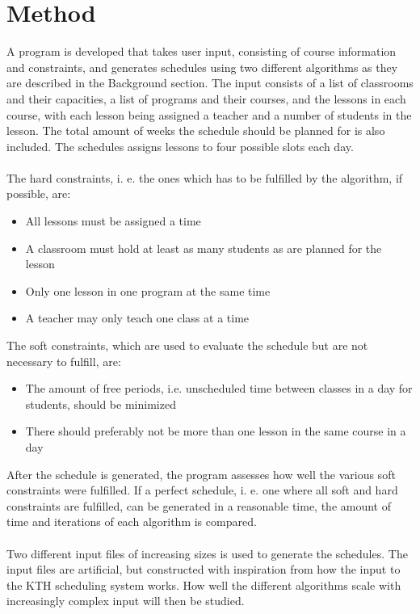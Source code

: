 \documentclass[titlepage,a4paper]{article}
\begin{document}
\section{Method}
A program is developed that takes user input, consisting of course information and constraints, and generates schedules using two different algorithms as they are described in the Background section. The input consists of a list of classrooms and their capacities, a list of programs and their courses, and the lessons in each course, with each lesson being assigned a teacher and a number of students in the lesson. The total amount of weeks the schedule should be planned for is also included.
The schedules assigns lessons to four possible slots each day. \\\\
The hard constraints, i. e. the ones which has to be fulfilled by the algorithm, if possible, are:
\begin{itemize}
  \item All lessons must be assigned a time
  \item A classroom must hold at least as many students as are planned for the lesson
  \item Only one lesson in one program at the same time
  \item A teacher may only teach one class at a time
\end{itemize} 
\medskip
The soft constraints, which are used to evaluate the schedule but are not necessary to fulfill, are:
\begin{itemize}
  \item The amount of free periods, i.e. unscheduled time between classes in a day for students, should be minimized
  \item There should preferably not be more than one lesson in the same course in a day
\end{itemize}
\medskip
After the schedule is generated, the program assesses how well the various soft constraints were fulfilled. If a perfect schedule, i. e. one where all soft and hard constraints are fulfilled, can be generated in a reasonable time, the amount of time and iterations of each algorithm is compared. \\\\
Two different input files of increasing sizes is used to generate the schedules. The input files are artificial, but constructed with inspiration from how the input to the KTH scheduling system works.
How well the different algorithms scale with increasingly complex input will then be studied.
\end{document}
